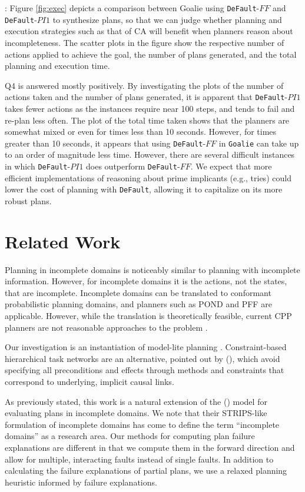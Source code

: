 \documentclass[letterpaper]{article}
\def\und#1{\noindent{\bf #1}:}
\def\default{{\tt DeFault}}
\def\goalie{{\tt Goalie}}
\def\citep#1{\cite{#1}}
\def\citet#1{\citeauthor{#1} (\citeyear{#1})}
\begin{document}
 

\und{On-line Planning \& Execution Results} Figure \ref{fig:exec} depicts a
comparison between Goalie using \default{}-$FF$ and \default{}-$PI1$ to
synthesize plans, so that we can judge whether planning and execution strategies
such as that of CA will benefit when planners reason about incompleteness.  The
scatter plots in the figure show the respective number of actions applied to
achieve the goal, the number of plans generated, and the total planning and
execution time.

Q4 is answered mostly positively. By investigating the plots of the number of
actions taken and the number of plans generated, it is apparent that
\default-$PI1$ takes fewer actions as the instances require near 100 steps, and
tends to fail and re-plan less often. The plot of the total time taken shows
that the planners are somewhat mixed or even for times less than 10 seconds.  However,
for times greater than 10 seconds, it appears that using \default-$FF$ in
\goalie{} can take up to an order of magnitude less time.  However, there are
several difficult instances in which \default-$PI1$ does outperform
\default-$FF$.    We expect that more efficient implementations of reasoning
about prime implicants (e.g., tries) could lower the cost of planning with
\default{}, allowing it to capitalize on its more robust plans.
 

\section{Related Work}

Planning in incomplete domains is noticeably similar to planning with incomplete
information. However, for incomplete domains it is the actions, not the states,
that are incomplete. Incomplete domains can be translated to conformant probabilistic planning
domains, and planners such as POND \citep{aij-mclug} and PFF \citep{pff} are
applicable.  However, while the translation is theoretically feasible, current
CPP planners are not reasonable approaches to the problem
\citep{USU-CS-TR-11-001}.
 

Our investigation is an instantiation of model-lite planning \citep{modellite}.
Constraint-based hierarchical task networks are an alternative, pointed out by
\citet{modellite},  which avoid specifying all preconditions and effects through
methods and constraints that correspond to underlying, implicit causal links.
 
As previously stated, this work is a natural extension of the \citet{Garland02}
model for evaluating plans in incomplete domains.
We note that their STRIPS-like formulation of incomplete domains has come to
define the term ``incomplete domains'' as a research area.  Our methods for
computing plan failure explanations are  different in that we compute them in the
forward direction and allow for multiple, interacting faults instead of 
single faults.  In addition to calculating the failure explanations of partial
plans, we use a relaxed planning heuristic informed by failure
explanations.
\end{document}
